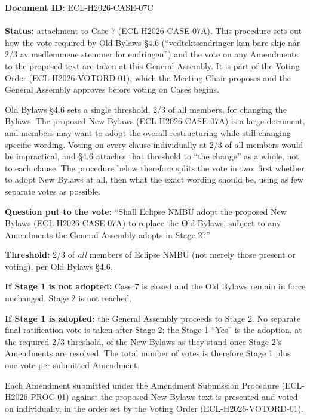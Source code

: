 \documentclass{../../../Common/Latex/Templates/rapport}
\date{\meetingdate, \meetingtime}
\begin{document}
\makecoverpage
\tableofcontents
\reportmainmatter

\noindent\textbf{Document ID:} ECL-H2026-CASE-07C\\
\meetingline\\
\textbf{Status:} attachment to Case 7 (ECL-H2026-CASE-07A). This procedure sets out how the vote required by Old Bylaws \S4.6 (``vedtektsendringer kan bare skje når 2/3 av medlemmene stemmer for endringen'') and the vote on any Amendments to the proposed text are taken at this General Assembly. It is part of the Voting Order (ECL-H2026-VOTORD-01), which the Meeting Chair proposes and the General Assembly approves before voting on Cases begins.

Old Bylaws \S4.6 sets a single threshold, 2/3 of all members, for changing the Bylaws. The proposed New Bylaws (ECL-H2026-CASE-07A) is a large document, and members may want to adopt the overall restructuring while still changing specific wording. Voting on every clause individually at 2/3 of all members would be impractical, and \S4.6 attaches that threshold to ``the change'' as a whole, not to each clause. The procedure below therefore splits the vote in two: first whether to adopt New Bylaws at all, then what the exact wording should be, using as few separate votes as possible.

\textbf{Question put to the vote:} ``Shall Eclipse NMBU adopt the proposed New Bylaws (ECL-H2026-CASE-07A) to replace the Old Bylaws, subject to any Amendments the General Assembly adopts in Stage 2?''

\textbf{Threshold:} 2/3 of \emph{all} members of Eclipse NMBU (not merely those present or voting), per Old Bylaws \S4.6.

\textbf{If Stage 1 is not adopted:} Case 7 is closed and the Old Bylaws remain in force unchanged. Stage 2 is not reached.

\textbf{If Stage 1 is adopted:} the General Assembly proceeds to Stage 2. No separate final ratification vote is taken after Stage 2: the Stage 1 ``Yes'' is the adoption, at the required 2/3 threshold, of the New Bylaws as they stand once Stage 2's Amendments are resolved. The total number of votes is therefore Stage 1 plus one vote per submitted Amendment.

Each Amendment submitted under the Amendment Submission Procedure (ECL-H2026-PROC-01) against the proposed New Bylaws text is presented and voted on individually, in the order set by the Voting Order (ECL-H2026-VOTORD-01).
\end{document}
